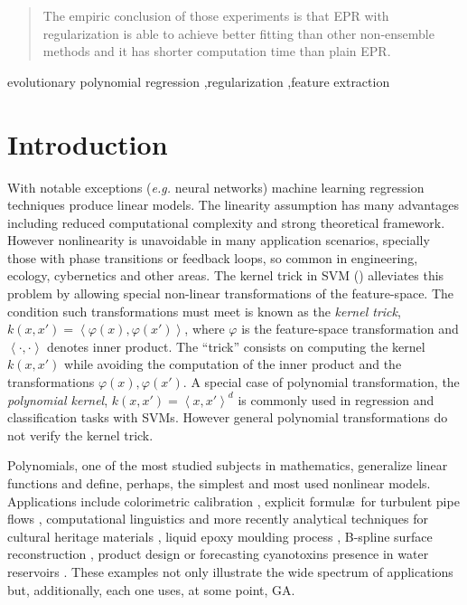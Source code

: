 \documentclass[times,review,preprint]{elsarticle}
\newcommand{\at}[1]{\ensuremath{\!\left(#1\right)}}
\begin{document}
\begin{frontmatter}
\begin{abstract}
The empiric conclusion of those experiments is that EPR with regularization is able to achieve better fitting than other non-ensemble methods and it has shorter computation time than plain EPR.
\end{abstract}

\begin{keyword}
evolutionary polynomial regression \sep regularization \sep feature extraction \end{keyword}

\end{frontmatter}

\linenumbers

\section{Introduction}
With notable exceptions (\emph{e.g.} neural networks) machine learning regression techniques produce linear models. The linearity assumption has many advantages including reduced computational complexity and strong the\-o\-re\-ti\-cal framework. However nonlinearity is unavoidable in many application scenarios, specially those with phase transitions or feedback loops, so common in engineering, ecology, cybernetics and other areas. The kernel trick in \ac{SVM} (\cite{scholkopf1997kernel, liang2012eigen, Bao:2013aa}) alleviates this problem by allowing special non-linear transformations of the feature-space. The condition such transformations must meet is known as the \emph{kernel trick}, $k\at{x,x'} = \left< \varphi\at{x}, \varphi\at{x'} \right>$, where $\varphi$ is the feature-space transformation and $\left<\cdot,\cdot\right>$ denotes inner product. The ``trick'' consists on computing the kernel $k\at{x,x'}$ while avoiding the computation of the inner product and the transformations $\varphi\at{x}, \varphi\at{x'}$. A special case of polynomial transformation, the \emph{polynomial kernel}, $k\at{x,x'} = \left<x,x'\right>^d$ is commonly used in regression and classification tasks with \acp{SVM}. However general polynomial transformations do not verify the kernel trick.

Polynomials, one of the most studied subjects in mathematics, generalize li\-ne\-ar functions and define, perhaps, the simplest and most used nonlinear models. Applications include colorimetric calibration \citep{Mendes:2005aa}, explicit formul\ae\ for turbulent pipe flows
 \citep{Davidson:1999aa}, computational linguistics \citep{Sanchez:2009aa} and more recently analytical techniques for cultural heritage materials \citep{Csefalvayova:2010aa}, liquid epoxy moulding process \citep{Chan:2011aa}, B-spline surface reconstruction \citep{Galvez:2012aa}, product design \citep{Chan:2012aa} or forecasting cyanotoxins presence in water reservoirs \citep{Garcia-Nieto:2013aa}. These examples not only illustrate the wide spectrum of applications but, additionally, each one uses, at some point, \ac{GA}.
\end{document}
